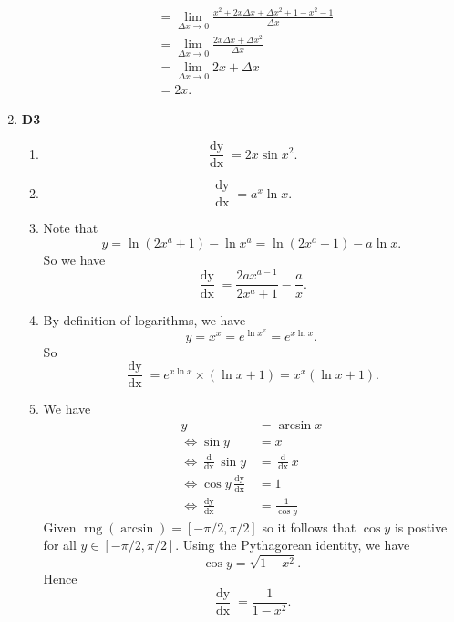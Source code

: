 \documentclass[12pt,oneside]{book}
\DeclareMathOperator{\rng}{rng}
\begin{document}
\begin{enumerate}
\begin{align*}
            &= \lim_{\Delta x \to 0} \frac{x^2 + 2x \Delta x + \Delta x^2 + 1 - x^2 - 1}{\Delta x} \\
            &= \lim_{\Delta x \to 0} \frac{2x \Delta x + \Delta x^2}{\Delta x} \\
            &= \lim_{\Delta x \to 0} 2x + \Delta x \\
            &= 2x.
        \end{align*} 
        \item \textbf{D3} \begin{enumerate}
            \item \[
                \frac{\mathop{\mathrm{d}y}}{\mathop{\mathrm{d}x}} = 2x \sin x^2 
            .\] 
            \item \[
                \frac{\mathop{\mathrm{d}y}}{\mathop{\mathrm{d}x}} = a^x \ln x
            .\] 
            \item Note that \[
                y = \ln (2x^a + 1) - \ln x^a = \ln (2x^a + 1) - a\ln x
            .\] So we have \[
                \frac{\mathop{\mathrm{d}y}}{\mathop{\mathrm{d}x}} = \frac{2ax^{a-1}}{2x^a + 1} - \frac{a}{x}
            .\] 
            \item By definition of logarithms, we have \[
                y = x^x = e^{\ln x^x} = e^{x \ln x}
            .\] So \[
                \frac{\mathop{\mathrm{d}y}}{\mathop{\mathrm{d}x}} = e^{x \ln x} \times (\ln x + 1) = x^x (\ln x + 1)
            .\] 
            \item We have \begin{align*}
                y &= \arcsin x \\
                \iff \sin y &= x \\
                \iff \frac{\mathop{\mathrm{d}}}{\mathop{\mathrm{d}x}} \sin y &= \frac{\mathop{\mathrm{d}}}{\mathop{\mathrm{d}x}} x \\
                \iff \cos y \frac{\mathop{\mathrm{d}y}}{\mathop{\mathrm{d}x}} &= 1 \\
                \iff \frac{\mathop{\mathrm{d}y}}{\mathop{\mathrm{d}x}} &= \frac{1}{\cos y}
            \end{align*}
            Given $\rng(\arcsin)  = [-\pi/2, \pi/2]$ so it follows that $\cos y$ is postive for all $y \in [-\pi/2, \pi/2]$. Using the Pythagorean identity, we have \[
                \cos y = \sqrt{1 - x^2} 
            .\] Hence \[
                \frac{\mathop{\mathrm{d}y}}{\mathop{\mathrm{d}x}} = \frac{1}{1-x^2}
            .\] 
        \end{enumerate}

\end{enumerate}
\end{document}
